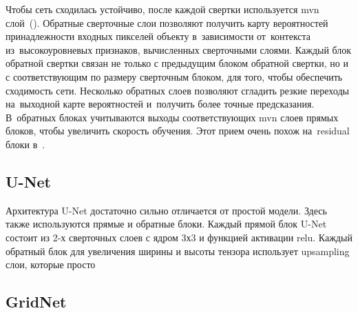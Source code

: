 Чтобы сеть сходилась устойчиво, после каждой свертки используется mvn слой~(\cite{batch_norm}). Обратные сверточные слои позволяют получить карту вероятностей принадлежности входных пикселей объекту в~зависимости от~контекста из~высокоуровневых признаков, вычисленных сверточными слоями. Каждый блок обратной свертки связан не только с предыдущим блоком обратной свертки, но и с соответствующим по размеру сверточным блоком, для того, чтобы обеспечить сходимость сети. Несколько обратных слоев позволяют сгладить резкие переходы на~выходной карте вероятностей и~получить более точные предсказания. В~обратных блоках учитываются выходы соответствующих mvn слоев прямых блоков, чтобы увеличить скорость обучения. Этот прием очень похож на~residual блоки в~\cite{resnet}.

\subsection{U-Net}

Архитектура U-Net \cite{unet} достаточно сильно отличается от простой модели. Здесь также используются прямые и обратные блоки. Каждый прямой блок U-Net состоит из 2-х сверточных слоев с ядром 3х3 и функцией активации relu. Каждый обратный блок для увеличения ширины и высоты тензора использует upsampling слои, которые просто

\subsection{GridNet}
